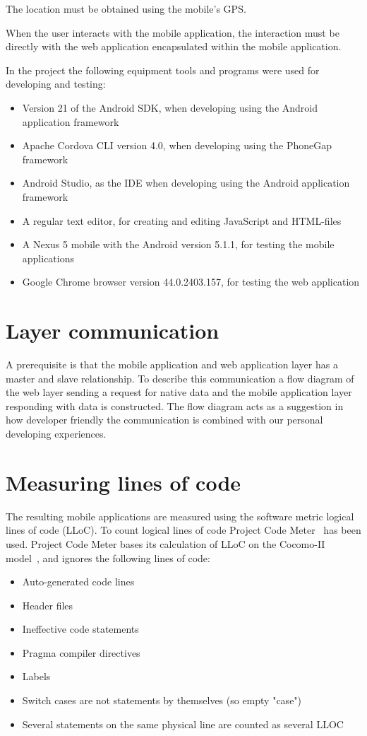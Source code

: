 The location must be obtained using the mobile’s GPS. 

When the user interacts with the mobile application, the interaction must be directly with the web application encapsulated within the mobile application. 

In the project the following equipment tools and programs were used for developing and testing:
\begin{itemize}
\item Version 21 of the Android SDK, when developing using the Android application framework
\item Apache Cordova CLI version 4.0, when developing using the PhoneGap framework
\item Android Studio, as the IDE when developing using the Android application framework
\item A regular text editor, for creating and editing JavaScript and HTML-files
\item A Nexus 5 mobile with the Android version 5.1.1, for testing the mobile applications
\item Google Chrome browser version 44.0.2403.157, for testing the web application
\end{itemize}

\section{Layer communication} \label{sec:layer-communication}
A prerequisite is that the mobile application and web application layer has a master and slave relationship. To describe this communication a flow diagram of the web layer sending a request for native data and the mobile application layer responding with data is constructed. The flow diagram acts as a suggestion in how developer friendly the communication is combined with our personal developing experiences.

\section{Measuring lines of code}\label{sec:measuring-lines-of-code}
The resulting mobile applications are measured using the software metric logical lines of code (LLoC). To count logical lines of code Project Code Meter~\cite{project-code-meter2015} has been used. Project Code Meter bases its calculation of LLoC on the Cocomo-II model~\cite{cocomo-ii-model}, and ignores the following lines of code:

\begin{itemize}
\item Auto-generated code lines
\item Header files
\item Ineffective code statements
\item Pragma compiler directives
\item Labels
\item Switch cases are not statements by themselves (so empty "case")
\item Several statements on the same physical line are counted as several LLOC
\end{itemize}

